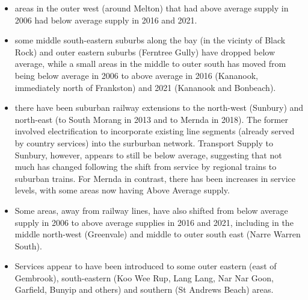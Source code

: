 \documentclass[preprint, 3p,
authoryear]{elsarticle} %
\providecommand{\tightlist}{%
  \setlength{\itemsep}{0pt}\setlength{\parskip}{0pt}}
\begin{document}
\begin{itemize}
\tightlist
\item
  areas in the outer west (around Melton) that had above average supply
  in 2006 had below average supply in 2016 and 2021.
\item
  some middle south-eastern suburbs along the bay (in the vicinty of
  Black Rock) and outer eastern suburbs (Ferntree Gully) have dropped
  below average, while a small areas in the middle to outer south has
  moved from being below average in 2006 to above average in 2016
  (Kananook, immediately north of Frankston) and 2021 (Kananook and
  Bonbeach).
\item
  there have been suburban railway extensions to the north-west
  (Sunbury) and north-east (to South Morang in 2013 and to Mernda in
  2018). The former involved electrification to incorporate existing
  line segments (already served by country services) into the surburban
  network. Transport Supply to Sunbury, however, appears to still be
  below average, suggesting that not much has changed following the
  shift from service by regional trains to suburban trains. For Mernda
  in contrast, there has been increases in service levels, with some
  areas now having Above Average supply.
\item
  Some areas, away from railway lines, have also shifted from below
  average supply in 2006 to above average supplies in 2016 and 2021,
  including in the middle north-west (Greenvale) and middle to outer
  south east (Narre Warren South).
\item
  Services appear to have been introduced to some outer eastern (east of
  Gembrook), south-eastern (Koo Wee Rup, Lang Lang, Nar Nar Goon,
  Garfield, Bunyip and others) and southern (St Andrews Beach) areas.
\end{itemize}
\end{document}
